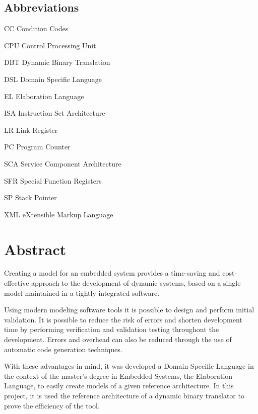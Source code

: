 \documentclass[11pt]{report}
\newenvironment{abbreviations}{\begin{list}{}{\renewcommand{\makelabel}{\abbrlabel}}}{\end{list}}
\newcommand{\abbrlabel}[1]{\makebox[3cm][l]{\textbf{#1}\ \dotfill}}
\begin{document}
\section*{Abbreviations}
\begin{abbreviations} 
	\item[CC] Condition Codes
	\item[CPU] Control Processing Unit
	\item[DBT] Dynamic Binary Translation
	\item[DSL] Domain Specific Language
	\item[EL] Elaboration Language
	\item[ISA] Instruction Set Architecture
	\item[LR] Link Register
	\item[PC] Program Counter
	\item[SCA] Service Component Architecture
	\item[SFR] Special Function Registers
	\item[SP] Stack Pointer
	\item[XML] eXtensible Markup Language
\end{abbreviations}
\newpage
\chapter{Abstract}

\par Creating a model for an embedded system provides a time-saving and cost-effective approach to the development of dynamic systems, based on a single model maintained in a tightly integrated software. 
\par Using modern modeling software tools it is possible to design and perform initial validation. It is possible to reduce the risk of errors and shorten development time by performing verification and validation testing throughout the development. Errors and overhead can also be reduced through the use of automatic code generation techniques\cite{j.h.foleissa.l.t.d'amatoa.f.dasilva2012}.
\par With these advantages in mind, it was developed a Domain Specific Language in the context of the master's degree in Embedded Systems, the Elaboration Language, to easily create models of a given reference architecture. In this project, it is used the reference architecture of a dynamic binary translator to prove the efficiency of the tool.
\end{document}
